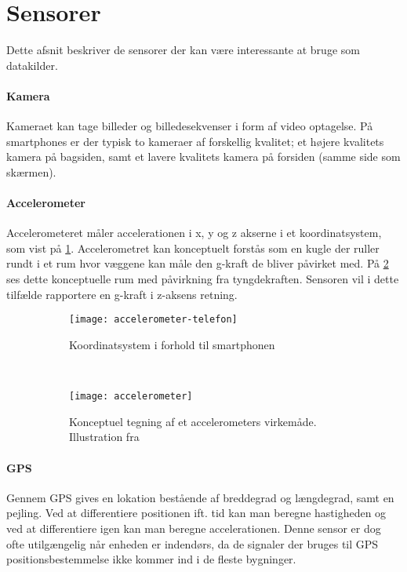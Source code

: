 \section{Sensorer}\label{sensorer}
Dette afsnit beskriver de sensorer der kan være interessante at bruge som datakilder. 

\paragraph{Kamera}
Kameraet kan tage billeder og billedesekvenser i form af video optagelse.
På smartphones er der typisk to kameraer af forskellig kvalitet; et højere kvalitets kamera på bagsiden, samt et lavere kvalitets kamera på forsiden (samme side som skærmen).

\paragraph{Accelerometer}
Accelerometeret måler accelerationen i x, y og z akserne i et koordinatsystem, som vist på \cref{analyse:accelerometer:koo}.
Accelerometret kan konceptuelt forstås som en kugle der ruller rundt i et rum hvor væggene kan måle den g-kraft de bliver påvirket med.
På \cref{analyse:accelerometer:kraft} ses dette konceptuelle rum med påvirkning fra tyngdekraften. 
Sensoren vil i dette tilfælde rapportere en g-kraft i z-aksens retning.

\begin{figure}[h]
	\centering
	\begin{subfigure}[b]{0.47\textwidth}
		\centering
		\texttt{[image: accelerometer-telefon]}
		\caption{Koordinatsystem i forhold til smartphonen}
		\label{analyse:accelerometer:koo}
	\end{subfigure}
	~
	\begin{subfigure}[b]{0.47\textwidth}
		\centering
		\texttt{[image: accelerometer]}
		\caption{Konceptuel tegning af et accelerometers virkemåde. Illustration fra \citep{accelerometer}}
		\label{analyse:accelerometer:kraft}
	\end{subfigure}
	\caption{}
	\label{accelerometer}
\end{figure} 

\paragraph{GPS}
Gennem GPS gives en lokation bestående af breddegrad og længdegrad, samt en pejling.
Ved at differentiere positionen ift. tid kan man beregne hastigheden og ved at differentiere igen kan man beregne accelerationen.
Denne sensor er dog ofte utilgængelig når enheden er indendørs, da de signaler der bruges til GPS positionsbestemmelse ikke kommer ind i de fleste bygninger.

